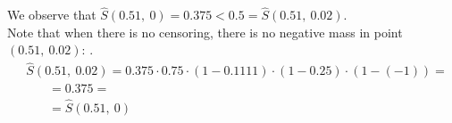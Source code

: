 \documentclass[]{article}
\begin{document}
We observe that $\hat{S}(0.51,~0) = 0.375 < 0.5 = \hat{S}(0.51,~0.02)$.\\

Note that when there is no censoring, there is no negative mass in point $(0.51,~0.02)$: .
	$$
	\begin{aligned}
		&\hat{S}(0.51,~0.02) = 0.375 \cdot 0.75 \cdot (1-0.1111)\cdot (1-0.25)\cdot (1-(-1)) = \\
    &~~~~~~~~ = 0.375 = \\
    &~~~~~~~~ =\hat{S}(0.51,~0)
	\end{aligned}
	$$



%
%
%
%
%
%
%
\end{document}
